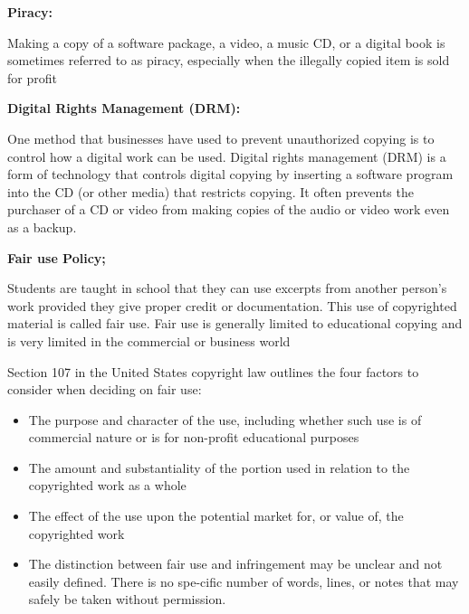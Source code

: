 \documentclass{report}
\begin{document}
    \bigbreak \noindent \bigbreak \noindent 
    \begin{Large}
        \textbf{Piracy:}
    \end{Large}

    \bigbreak \noindent 
    Making a copy of a software package, a video, a music CD, or a digital book is sometimes referred to as piracy, especially when the illegally copied item is sold for profit

    \bigbreak \noindent \bigbreak \noindent 
    \begin{Large}
        \textbf{Digital Rights Management (DRM):}
    \end{Large}

    \bigbreak \noindent 
    One method that businesses have used to prevent unauthorized copying is to control how a digital work can be used. Digital rights management (DRM) is a form of technology that controls digital copying by inserting a software program into the CD (or other media) that restricts copying. It often prevents the purchaser of a CD or video from making copies of the audio or video work even as a backup.

    \bigbreak \noindent 

    \bigbreak \noindent \bigbreak \noindent 
    \begin{Large}
        \textbf{Fair use Policy;}
    \end{Large}
    
    \bigbreak \noindent 
    Students are taught in school that they can use excerpts from another person’s work provided they give proper credit or documentation. This use of copyrighted material is called fair use. Fair use is generally limited to educational copying and is very limited in the commercial or business world

    \bigbreak \noindent 
    Section 107 in the United States copyright law outlines the four factors to consider when deciding on fair use:

    \bigbreak \noindent 
    \begin{itemize}
        \item The purpose and character of the use, including whether such use is of commercial nature or is for non-profit educational purposes
        \item The amount and substantiality of the portion used in relation to the copyrighted work as a whole
        \item The effect of the use upon the potential market for, or value of, the copyrighted work
        \item The distinction between fair use and infringement may be unclear and not easily defined. There is no spe-cific number of words, lines, or notes that may safely be taken without permission.
    \end{itemize}
\end{document}
